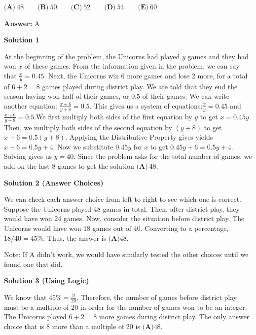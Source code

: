 \begin{enumerate}
 $\textbf{(A)}\ 48 \qquad \textbf{(B)}\ 50 \qquad \textbf{(C)}\ 52 \qquad \textbf{(D)}\ 54 \qquad \textbf{(E)}\ 60$

 \textbf{Answer: }A



\textbf{Solution 1}

At the beginning of the problem, the Unicorns had played $y$ games and they had won $x$ of these games. From the information given in the problem, we can say that $\frac{x}{y}=0.45.$ Next, the Unicorns win 6 more games and lose 2 more, for a total of $6+2=8$ games played during district play. We are told that they end the season having won half of their games, or $0.5$ of their games. We can write another equation: $\frac{x+6}{y+8}=0.5.$ This gives us a system of equations:$\frac{x}{y}=0.45$ and $\frac{x+6}{y+8}=0.5.$We first multiply both sides of the first equation by $y$ to get $x=0.45y.$ Then, we multiply both sides of the second equation by $(y+8)$ to get $x+6=0.5(y+8).$ Applying the Distributive Property gives yields $x+6=0.5y+4.$ Now we substitute $0.45y$ for $x$ to get $0.45y+6=0.5y+4.$ Solving gives us $y=40.$ Since the problem asks for the total number of games, we add on the last 8 games to get the solution $\boxed{\textbf{(A)}\ 48}$.

 



\textbf{Solution 2 (Answer Choices)}

We can check each answer choice from left to right to see which one is correct. Suppose the Unicorns played $48$ games in total. Then, after district play, they would have won $24$ games. Now, consider the situation before district play. The Unicorns would have won $18$ games out of $40$. Converting to a percentage, $18/40 = 45\%$. Thus, the answer is $\boxed{\textbf{(A)} 48}$.

 Note: If A didn't work, we would have similarly tested the other choices until we found one that did.

 



\textbf{Solution 3 (Using Logic)}

We know that $45\%=\frac9{20}$. Therefore, the number of games before district play must be a multiple of $20$ in order for the number of games won to be an integer. The Unicorns played $6+2=8$ more games during district play. The only answer choice that is $8$ more than a multiple of $20$ is $\boxed{\textbf{(A)} 48}$.

 




\end{enumerate}
